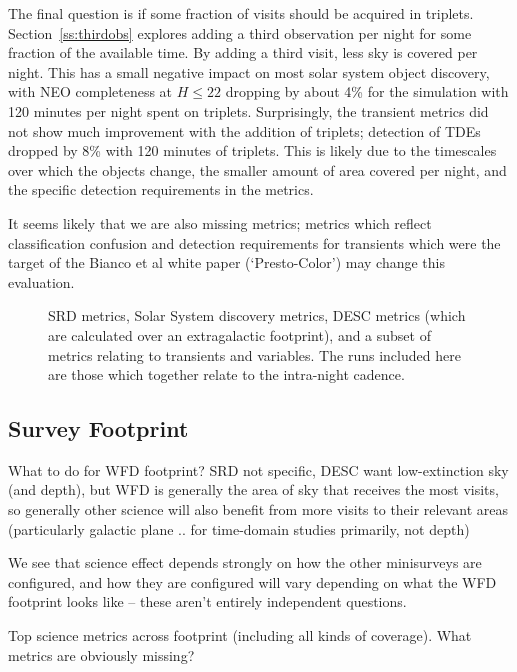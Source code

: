 The final question is if some fraction of visits should be acquired in triplets. Section~\ref{ss:thirdobs} explores adding a third observation per night for some fraction of the available time. By adding a third visit, less sky is covered per night. This has a small negative impact on most solar system object discovery, with NEO completeness at $H\le22$ dropping by about 4\% for the simulation with 120 minutes per night spent on triplets. Surprisingly, the transient metrics did not show much improvement with the addition of triplets; detection of TDEs dropped by 8\% with 120 minutes of triplets. This is likely due to the timescales over which the objects change, the smaller amount of area covered per night, and the specific detection requirements in the metrics.  

It seems likely that we are also missing metrics; metrics which reflect classification confusion and detection requirements for transients which were the target of the Bianco et al white paper (`Presto-Color') may change this evaluation. 

\begin{figure}
\caption{SRD metrics, Solar System discovery metrics, DESC metrics (which are calculated over an extragalactic footprint), and a subset of metrics relating to transients and variables. The runs included here are those which together relate to the intra-night cadence.}
\label{fig:intranight}
\end{figure}


\subsection{Survey Footprint}\label{sec:bigfootprints}

What to do for WFD footprint? SRD not specific, DESC want low-extinction sky (and depth), but WFD is generally the area of sky that receives the most visits, so generally other science will also benefit from more visits to their relevant areas (particularly galactic plane .. for time-domain studies primarily, not depth)

We see that science effect depends strongly on how the other minisurveys are configured, and how they are configured will vary depending on what the WFD footprint looks like -- these aren't entirely independent questions. 

Top science metrics across footprint (including all kinds of coverage). 
What metrics are obviously missing?

